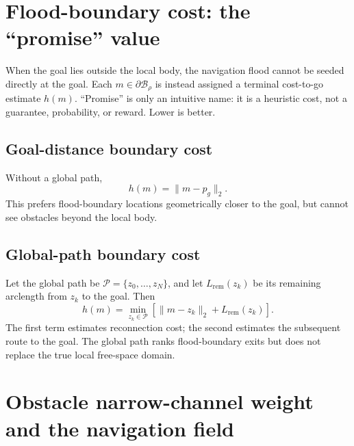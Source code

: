 \documentclass[11pt,a4paper]{article}
\newcommand{\B}{\mathcal{B}}
\newcommand{\Path}{\mathcal{P}}
\begin{document}
\section{Flood-boundary cost: the ``promise'' value}

When the goal lies outside the local body, the navigation flood cannot be
seeded directly at the goal. Each $m\in\partial\B_\rho$ is instead assigned a terminal
cost-to-go estimate $h(m)$. ``Promise'' is only an intuitive name: it is a
heuristic cost, not a guarantee, probability, or reward. Lower is better.

\subsection{Goal-distance boundary cost}

Without a global path,
\begin{equation}
  h(m)=\lVert m-p_g\rVert_2.
  \label{eq:goal-promise}
\end{equation}
This prefers flood-boundary locations geometrically closer to the goal, but cannot
see obstacles beyond the local body.

\subsection{Global-path boundary cost}

Let the global path be $\Path=\{z_0,\ldots,z_N\}$, and let
$L_{\mathrm{rem}}(z_k)$ be its remaining arclength from $z_k$ to the goal.
Then
\begin{equation}
  h(m)=
  \min_{z_k\in\Path}
  \left[
  \lVert m-z_k\rVert_2+L_{\mathrm{rem}}(z_k)
  \right].
  \label{eq:path-promise}
\end{equation}
The first term estimates reconnection cost; the second estimates the
subsequent route to the goal. The global path ranks flood-boundary exits but
does not replace the true local free-space domain.

\section{Obstacle narrow-channel weight and the navigation field}
\end{document}
